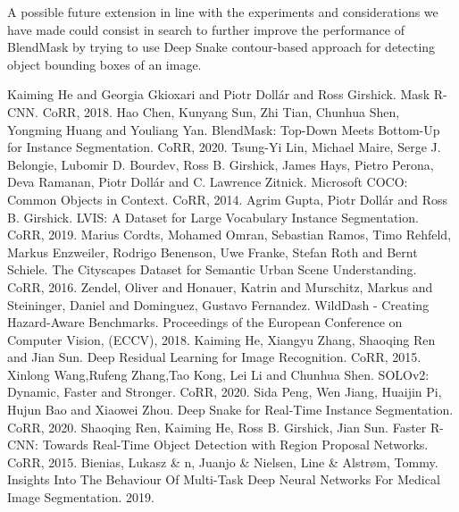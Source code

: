 \documentclass[10pt,twocolumn,letterpaper]{article}
\begin{document}
A possible future extension in line with the experiments and considerations we have made could consist in search to further improve the performance of BlendMask by trying to use Deep Snake contour-based approach for detecting object bounding boxes of an image.

\begin{thebibliography}{1}
Kaiming He and Georgia Gkioxari and Piotr Dollár and Ross Girshick.
Mask R-CNN. CoRR, 2018.
Hao Chen, Kunyang Sun, Zhi Tian, Chunhua Shen, Yongming Huang and Youliang Yan.
BlendMask: Top-Down Meets Bottom-Up for Instance Segmentation. CoRR, 2020.
Tsung-Yi Lin, Michael Maire, Serge J. Belongie, Lubomir D. Bourdev, Ross B. Girshick, James Hays, Pietro Perona, Deva Ramanan, Piotr Doll\'ar and C. Lawrence Zitnick.
Microsoft COCO: Common Objects in Context. CoRR, 2014.
Agrim Gupta, Piotr Doll\'ar and Ross B. Girshick.
LVIS: A Dataset for Large Vocabulary Instance Segmentation. CoRR, 2019.
Marius Cordts, Mohamed Omran, Sebastian Ramos, Timo Rehfeld, Markus Enzweiler, Rodrigo Benenson, Uwe Franke, Stefan Roth and Bernt Schiele.
The Cityscapes Dataset for Semantic Urban Scene Understanding. CoRR, 2016.
Zendel, Oliver and Honauer, Katrin and Murschitz, Markus and Steininger, Daniel and Dominguez, Gustavo Fernandez.
WildDash - Creating Hazard-Aware Benchmarks. Proceedings of the European Conference on Computer Vision, (ECCV), 2018.
Kaiming He, Xiangyu Zhang, Shaoqing Ren and Jian Sun.
Deep Residual Learning for Image Recognition. CoRR, 2015.
Xinlong Wang,Rufeng Zhang,Tao Kong, Lei Li and Chunhua Shen.
SOLOv2: Dynamic, Faster and Stronger. CoRR, 2020.
Sida Peng, Wen Jiang, Huaijin Pi, Hujun Bao and Xiaowei Zhou.
Deep Snake for Real-Time Instance Segmentation. CoRR, 2020.
Shaoqing Ren, Kaiming He, Ross B. Girshick, Jian Sun.
Faster R-CNN: Towards Real-Time Object Detection with Region Proposal Networks. CoRR, 2015.
Bienias, Lukasz \& n, Juanjo \& Nielsen, Line \& Alstrøm, Tommy. Insights Into The Behaviour Of Multi-Task Deep Neural Networks For Medical Image Segmentation. 2019.

\end{thebibliography}
\end{document}
